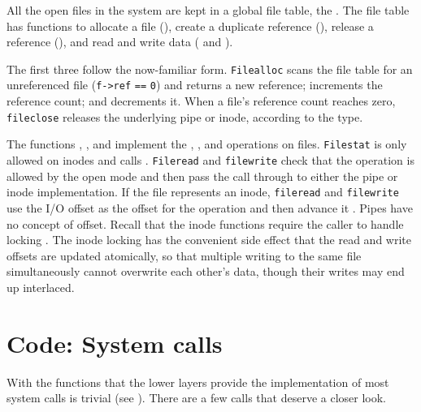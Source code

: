 All the open files in the system are kept in a global file table,
the 
.
The file table
has functions to allocate a file
(),
create a duplicate reference
(),
release a reference
(),
and read and write data
(
and 
).

The first three follow the now-familiar form.
\lstinline{Filealloc}
scans the file table for an unreferenced file
(\lstinline{f->ref}
\lstinline{==}
\lstinline{0})
and returns a new reference;
increments the reference count;
and
decrements it.
When a file's reference count reaches zero,
\lstinline{fileclose}
releases the underlying pipe or inode,
according to the type.

The functions
,
,
and
implement the 
,
,
and
operations on files.
\lstinline{Filestat}
is only allowed on inodes and calls
.
\lstinline{Fileread}
and
\lstinline{filewrite}
check that the operation is allowed by
the open mode and then
pass the call through to either
the pipe or inode implementation.
If the file represents an inode,
\lstinline{fileread}
and
\lstinline{filewrite}
use the I/O offset as the offset for the operation
and then advance it
.
Pipes have no concept of offset.
Recall that the inode functions require the caller
to handle locking
.
The inode locking has the convenient side effect that the
read and write offsets are updated atomically, so that
multiple writing to the same file simultaneously
cannot overwrite each other's data, though their writes may end up interlaced.
\section{Code: System calls}

With the functions that the lower layers provide the implementation of most
system calls is trivial
(see
).
There are a few calls that
deserve a closer look.


